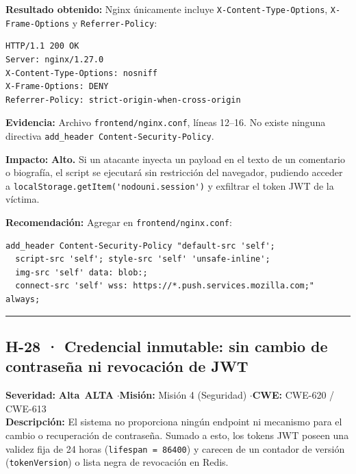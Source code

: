\documentclass[10pt,a4paper]{article}
\newcommand{\code}[1]{\nolinkurl{#1}}
\newcommand{\badgeAlta}{\colorbox{orange!20}{\textcolor{orange!90!black}{\textbf{\footnotesize Alta}}}}
\begin{document}
\noindent\textbf{Resultado obtenido:}
Nginx únicamente incluye \code{X-Content-Type-Options}, \code{X-Frame-Options} y \code{Referrer-Policy}:
\begin{tcolorbox}[colback=codebg,colframe=gray!40,arc=1mm]\small
\begin{verbatim}
HTTP/1.1 200 OK
Server: nginx/1.27.0
X-Content-Type-Options: nosniff
X-Frame-Options: DENY
Referrer-Policy: strict-origin-when-cross-origin
\end{verbatim}
\end{tcolorbox}

\noindent\textbf{Evidencia:}
Archivo \code{frontend/nginx.conf}, líneas 12--16. No existe ninguna directiva \code{add_header Content-Security-Policy}.

\noindent\textbf{Impacto:}
\textbf{Alto.} Si un atacante inyecta un payload en el texto de un comentario o biografía, el script se ejecutará sin restricción del navegador, pudiendo acceder a \code{localStorage.getItem('nodouni.session')} y exfiltrar el token JWT de la víctima.

\noindent\textbf{Recomendación:}
Agregar en \code{frontend/nginx.conf}:
\begin{tcolorbox}[colback=codebg,colframe=gray!40,arc=1mm]\small
\begin{verbatim}
add_header Content-Security-Policy "default-src 'self'; 
  script-src 'self'; style-src 'self' 'unsafe-inline'; 
  img-src 'self' data: blob:; 
  connect-src 'self' wss: https://*.push.services.mozilla.com;" always;
\end{verbatim}
\end{tcolorbox}

\vspace{0.8em}
\hrule
\vspace{0.8em}

\subsection{H-28 · Credencial inmutable: sin cambio de contraseña ni revocación de JWT}
\noindent\textbf{Severidad:} \badgeAlta\ \textbf{ALTA} \quad$\cdot$\quad \textbf{Misión:} Misión 4 (Seguridad) \quad$\cdot$\quad \textbf{CWE:} CWE-620 / CWE-613\\[0.3em]

\noindent\textbf{Descripción:}
El sistema no proporciona ningún endpoint ni mecanismo para el cambio o recuperación de contraseña. Sumado a esto, los tokens JWT poseen una validez fija de 24 horas (\code{lifespan = 86400}) y carecen de un contador de versión (\code{tokenVersion}) o lista negra de revocación en Redis.
\end{document}
